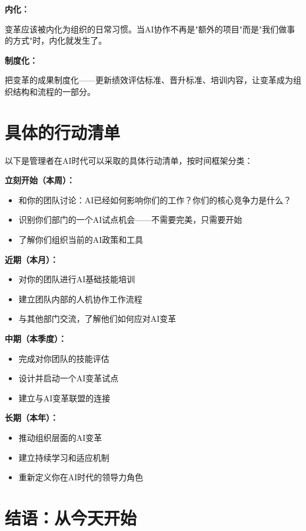 \textbf{内化：}

变革应该被内化为组织的日常习惯。当AI协作不再是"额外的项目"而是"我们做事的方式"时，内化就发生了。

\textbf{制度化：}

把变革的成果制度化——更新绩效评估标准、晋升标准、培训内容，让变革成为组织结构和流程的一部分。

\section{具体的行动清单}


以下是管理者在AI时代可以采取的具体行动清单，按时间框架分类：

\textbf{立刻开始（本周）：}

\begin{itemize}
\item 和你的团队讨论：AI已经如何影响你们的工作？你们的核心竞争力是什么？
\item 识别你们部门的一个AI试点机会——不需要完美，只需要开始
\item 了解你们组织当前的AI政策和工具

\end{itemize}
\textbf{近期（本月）：}

\begin{itemize}
\item 对你的团队进行AI基础技能培训
\item 建立团队内部的人机协作工作流程
\item 与其他部门交流，了解他们如何应对AI变革

\end{itemize}
\textbf{中期（本季度）：}

\begin{itemize}
\item 完成对你团队的技能评估
\item 设计并启动一个AI变革试点
\item 建立与AI变革联盟的连接

\end{itemize}
\textbf{长期（本年）：}

\begin{itemize}
\item 推动组织层面的AI变革
\item 建立持续学习和适应机制
\item 重新定义你在AI时代的领导力角色

\end{itemize}
\section{结语：从今天开始}



